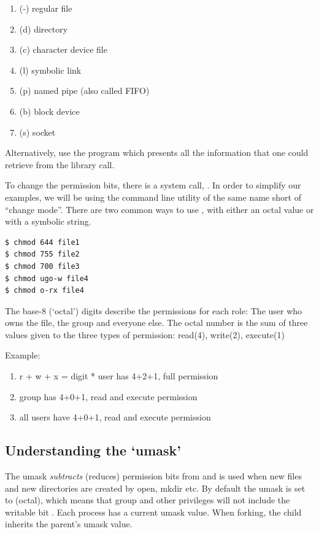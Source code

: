 \begin{enumerate}
    \item (-) regular file
    \item (d) directory
    \item (c) character device file
    \item (l) symbolic link
    \item (p) named pipe (also called FIFO)
    \item (b) block device
    \item (s) socket
\end{enumerate}

Alternatively, use the program  which presents all the information that one could retrieve from the  library call.

To change the permission bits, there is a system call, .
In order to simplify our examples, we will be using the command line utility of the same name  short of ``change mode''.
There are two common ways to use , with either an octal value or with a symbolic string.

\begin{lstlisting}[language=bash]
$ chmod 644 file1
$ chmod 755 file2
$ chmod 700 file3
$ chmod ugo-w file4
$ chmod o-rx file4
\end{lstlisting}

The base-8 (`octal') digits describe the permissions for each role: The user who owns the file, the group and everyone else.
The octal number is the sum of three values given to the three types of permission: read(4), write(2), execute(1)

Example: 

\begin{enumerate}
\item r + w + x = digit * user has 4+2+1, full permission
\item group has 4+0+1, read and execute permission
\item all users have 4+0+1, read and execute permission
\end{enumerate}

\subsection{Understanding the `umask'}

The umask \emph{subtracts} (reduces) permission bits from  and is used when new files and new directories are created by open, mkdir etc.
By default the umask is set to  (octal), which means that group and other privileges will not include the writable bit .
Each process has a current umask value.
When forking, the child inherits the parent's umask value.

